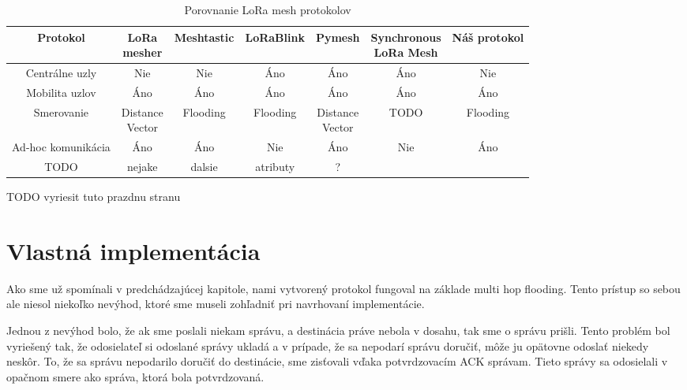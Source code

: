 \documentclass[slovak,master]{diploma}
\renewcommand{\thefootnote}{\arabic{footnote}}
\begin{document}
\renewcommand{\thefootnote}{\fnsymbol{footnote}}
\begin{table}[!h]
	\centering
  \small
  \setlength\tabcolsep{3pt}
	\caption[Porovnanie LoRa mesh protokolov]{Porovnanie LoRa mesh protokolov}
  \begin{tabular}{c|c|c|c|c|c|c}
    \toprule
    Protokol  & \makecell{LoRa \\ mesher} & Meshtastic & LoRaBlink & Pymesh & \makecell{Synchronous\\ LoRa Mesh} & Náš protokol\\
    \midrule
    Centrálne uzly & Nie & Nie & Áno & Áno & Áno & Nie \\
    \hline
    Mobilita uzlov & Áno\footnotemark[7] & Áno & Áno\footnotemark[1] & Áno\footnotemark[7] & Áno\footnotemark[1] & Áno\\
    \hline
    Smerovanie & \makecell{Distance \\ Vector} & Flooding & Flooding & \makecell{Distance \\ Vector} & TODO & Flooding\\
    \hline
    Ad-hoc komunikácia & Áno & Áno & Nie & Áno & Nie & Áno \\
    \hline
    TODO  & nejake & dalsie  & atributy & ? \\
    \midrule
  \end{tabular}
  \label{tab:compar}
\end{table}
\renewcommand{\thefootnote}{\arabic{footnote}}
TODO vyriesit tuto prazdnu stranu

\chapter{Vlastná implementácia}
Ako sme už spomínali v predchádzajúcej kapitole, nami vytvorený protokol fungoval na základe multi hop flooding. Tento prístup so sebou ale niesol 
niekoľko nevýhod, ktoré sme museli zohľadniť pri navrhovaní implementácie.

Jednou z nevýhod bolo, že ak sme poslali niekam správu, a destinácia práve nebola v dosahu, tak sme o správu prišli. Tento problém bol vyriešený tak, 
že odosielateľ si odoslané správy ukladá a v prípade, že sa nepodarí správu doručiť, môže ju opätovne 
odoslať niekedy neskôr. To, že sa správu nepodarilo doručiť do destinácie, sme zisťovali vďaka potvrdzovacím ACK správam. Tieto správy sa odosielali v opačnom smere ako správa, ktorá bola potvrdzovaná. 
\end{document}
